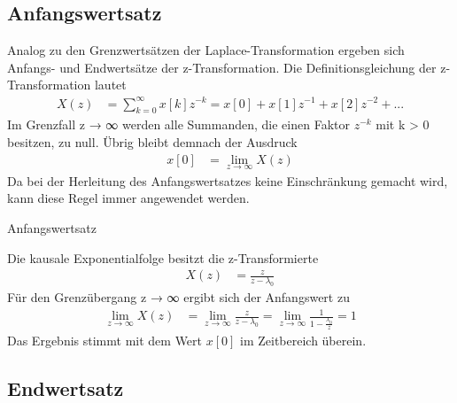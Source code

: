 \subsection{Anfangswertsatz}\label{sec:anfangswertsatz}

Analog zu den Grenzwertsätzen der Laplace-Transformation ergeben sich Anfangs- und Endwertsätze der z-Transformation. Die Definitionsgleichung der z-Transformation lautet
\begin{align}
X(z) &= \sum\limits_{k = 0}^{\infty}{x[ k]  z^{- k}} = x[ 0] + x[ 1]  z^{- 1} + x[ 2]  z^{- 2} + ... \label{eq:5.71}
\end{align}
Im Grenzfall z → ∞ werden alle Summanden, die einen Faktor \(z^{-k}\) mit k \textgreater{} 0 besitzen, zu null. Übrig bleibt demnach der Ausdruck
\begin{align}
x[ 0] &= \lim_{z \rightarrow \infty}X(z) \label{eq:5.72}
\end{align}
Da bei der Herleitung des Anfangswertsatzes keine Einschränkung gemacht wird, kann diese Regel immer angewendet werden.

\begin{example}{Anfangswertsatz}
\label{example:beispiel-anfangswertsatz}

Die kausale Exponentialfolge besitzt die z-Transformierte
\begin{align*}
X(z) &= \frac{z}{z - \lambda_{0}} 
\end{align*}
Für den Grenzübergang z → ∞ ergibt sich der Anfangswert zu
\begin{align*}
\lim_{z \rightarrow \infty}X(z) &= \lim_{z \rightarrow \infty}\frac{z}{z - \lambda_{0}} = \lim_{z \rightarrow \infty}\frac{1}{1 - \frac{\lambda_{0}}{z}} = 1 
\end{align*}
Das Ergebnis stimmt mit dem Wert \(x[0]\) im Zeitbereich überein.

\end{example}

\subsection{Endwertsatz}\label{sec:endwertsatz}

